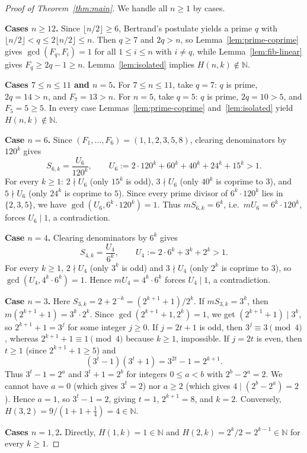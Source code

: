 \documentclass[11pt,a4paper]{article}
\begin{document}
\begin{proof}[Proof of Theorem~\ref{thm:main}]
We handle all $n \ge 1$ by cases.

\medskip
\noindent\textbf{Cases $n \ge 12$.}
Since $\lfloor n/2 \rfloor \ge 6$, Bertrand's postulate yields a prime $q$ with $\lfloor n/2 \rfloor < q \le 2\lfloor n/2 \rfloor \le n$. Then $q \ge 7$ and $2q > n$, so Lemma~\ref{lem:prime-coprime} gives $\gcd(F_q,F_i) = 1$ for all $1 \le i \le n$ with $i \ne q$, while Lemma~\ref{lem:fib-linear} gives $F_q \ge 2q - 1 \ge n$. Lemma~\ref{lem:isolated} implies $H(n,k) \notin \mathbb{N}$.

\medskip
\noindent\textbf{Cases $7 \le n \le 11$ and $n = 5$.}
For $7 \le n \le 11$, take $q = 7$: $q$ is prime, $2q = 14 > n$, and $F_7 = 13 > n$.
For $n = 5$, take $q = 5$: $q$ is prime, $2q = 10 > 5$, and $F_5 = 5 \ge 5$.
In every case Lemmas~\ref{lem:prime-coprime} and~\ref{lem:isolated} yield $H(n,k) \notin \mathbb{N}$.

\medskip
\noindent\textbf{Case $n = 6$.}
Since $(F_1,\dots,F_6) = (1,1,2,3,5,8)$, clearing denominators by $120^k$ gives
\[
S_{6,k} = \frac{U_6}{120^k}, \qquad U_6 := 2 \cdot 120^k + 60^k + 40^k + 24^k + 15^k > 1.
\]
For every $k \ge 1$: $2 \nmid U_6$ (only $15^k$ is odd), $3 \nmid U_6$ (only $40^k$ is coprime to $3$), and $5 \nmid U_6$ (only $24^k$ is coprime to $5$). Since every prime divisor of $6^k \cdot 120^k$ lies in $\{2,3,5\}$, we have $\gcd(U_6, 6^k \cdot 120^k) = 1$. Thus $m S_{6,k} = 6^k$, i.e.\ $m U_6 = 6^k \cdot 120^k$, forces $U_6 \mid 1$, a contradiction.

\medskip
\noindent\textbf{Case $n = 4$.}
Clearing denominators by $6^k$ gives
\[
S_{4,k} = \frac{U_4}{6^k}, \qquad U_4 := 2 \cdot 6^k + 3^k + 2^k > 1.
\]
For every $k \ge 1$, $2 \nmid U_4$ (only $3^k$ is odd) and $3 \nmid U_4$ (only $2^k$ is coprime to $3$), so $\gcd(U_4, 4^k \cdot 6^k) = 1$. Hence $m U_4 = 4^k \cdot 6^k$ forces $U_4 \mid 1$, a contradiction.

\medskip
\noindent\textbf{Case $n = 3$.}
Here $S_{3,k} = 2 + 2^{-k} = (2^{k+1} + 1)/2^k$. If $m S_{3,k} = 3^k$, then $m(2^{k+1}+1) = 3^k \cdot 2^k$. Since $\gcd(2^{k+1}+1, 2^k) = 1$, we get $(2^{k+1}+1) \mid 3^k$, so $2^{k+1} + 1 = 3^j$ for some integer $j \ge 0$.
If $j = 2t + 1$ is odd, then $3^j \equiv 3 \pmod 4$, whereas $2^{k+1} + 1 \equiv 1 \pmod 4$ because $k \ge 1$, impossible.
If $j = 2t$ is even, then $t \ge 1$ (since $2^{k+1}+1 \ge 5$) and
\[
(3^t - 1)(3^t + 1) = 3^{2t} - 1 = 2^{k+1}.
\]
Thus $3^t - 1 = 2^a$ and $3^t + 1 = 2^b$ for integers $0 \le a < b$ with $2^b - 2^a = 2$.
We cannot have $a = 0$ (which gives $3^t = 2$) nor $a \ge 2$ (which gives $4 \mid (2^b - 2^a) = 2$).
Hence $a = 1$, so $3^t - 1 = 2$, giving $t = 1$, $2^{k+1} = 8$, and $k = 2$.
Conversely, $H(3,2) = 9/(1 + 1 + \frac{1}{4}) = 4 \in \mathbb{N}$.

\medskip
\noindent\textbf{Cases $n = 1, 2$.}
Directly, $H(1,k) = 1 \in \mathbb{N}$ and $H(2,k) = 2^k / 2 = 2^{k-1} \in \mathbb{N}$ for every $k \ge 1$.
\end{proof}
\end{document}
